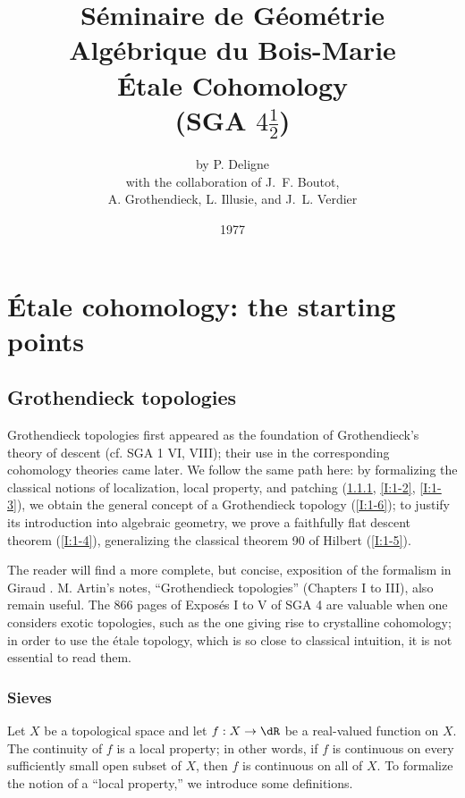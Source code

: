 \documentclass[oneside]{book}
\title{Séminaire de Géométrie Algébrique du Bois-Marie\\[20pt]
Étale Cohomology\\[20pt]
(SGA $4\frac 1 2$)}
\author{by P. Deligne\\[10pt]
with the collaboration of J.~F. Boutot,\\
A. Grothendieck, L. Illusie, and J.~L. Verdier}
\date{1977}
\begin{document}
\maketitle

\tableofcontents
\clearpage


\chapter{Étale cohomology: the starting points}\label{I}

\section{Grothendieck topologies}\label{I:1}

Grothendieck topologies first appeared as the foundation of Grothendieck's
theory of descent (cf. SGA 1 VI, VIII); their use in the corresponding
cohomology theories came later. We follow the same path here: by formalizing
the classical notions of localization, local property, and patching
(\ref{I:1-1}, \ref{I:1-2}, \ref{I:1-3}), we obtain the general concept of a
Grothendieck topology (\ref{I:1-6}); to justify its introduction into
algebraic geometry, we prove a faithfully flat descent theorem
(\ref{I:1-4}), generalizing the classical theorem 90 of Hilbert
(\ref{I:1-5}).

The reader will find a more complete, but concise, exposition of the
formalism in Giraud \cite{gi64}. M. Artin's notes, “Grothendieck
topologies” \cite{ar62} (Chapters I to III), also remain useful. The
866 pages of Exposés I to V of SGA 4 are valuable when one considers exotic
topologies, such as the one giving rise to crystalline cohomology; in order
to use the étale topology, which is so close to classical intuition, it is
not essential to read them.

\subsection{Sieves}\label{I:1-1}

Let $X$ be a topological space and let $f:X\to \dR$ be a real-valued
function on $X$. The continuity of $f$ is a local property; in other words,
if $f$ is continuous on every sufficiently small open subset of $X$, then
$f$ is continuous on all of $X$. To formalize the notion of a “local
property,” we introduce some definitions.
\end{document}
